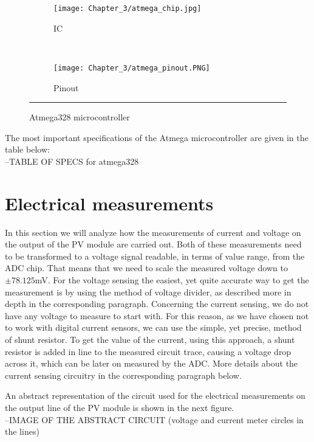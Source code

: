 \begin{figure}[htbp]
	\centering
	\begin{subfigure}[b]{.4\textwidth}
		\texttt{[image: Chapter\_3/atmega\_chip.jpg]}
	    \caption[]{IC}
	    \label{fig:atmega_chip}
	\end{subfigure}
    ~
	\begin{subfigure}[b]{.4\textwidth}
		\texttt{[image: Chapter\_3/atmega\_pinout.PNG]}
	    \caption[]{Pinout}
	    \label{fig:atmega_pinout}
	\end{subfigure}
	\rule{35em}{0.5pt}
	\caption{Atmega328 microcontroller}
	\label{fig:atmega}
\end{figure}

The most important specifications of the Atmega microcontroller are given in the table below:\\

--TABLE OF SPECS for atmega328\\

\section{Electrical measurements}
In this section we will analyze how the measurements of current and voltage on the output of the PV module are carried out. Both of these measurements need to be transformed to a voltage signal readable, in terms of value range, from the ADC chip. That means that we need to scale the measured voltage down to $\pm 78.125$mV. For the voltage sensing the easiest, yet quite accurate way to get the measurement is by using the method of voltage divider, as described more in depth in the corresponding paragraph. Concerning the current sensing, we do not have any voltage to measure to start with. For this reason, as we have chosen not to work with digital current sensors, we can use the simple, yet precise, method of shunt resistor. To get the value of the current, using this approach, a shunt resistor is added in line to the measured circuit trace, causing a voltage drop across it, which can be later on measured by the ADC. More details about the current sensing circuitry in the corresponding paragraph below.

An abstract representation of the circuit used for the electrical measurements on the output line of the PV module is shown in the next figure.\\

--IMAGE OF THE ABSTRACT CIRCUIT (voltage and current meter circles in the lines)\\

